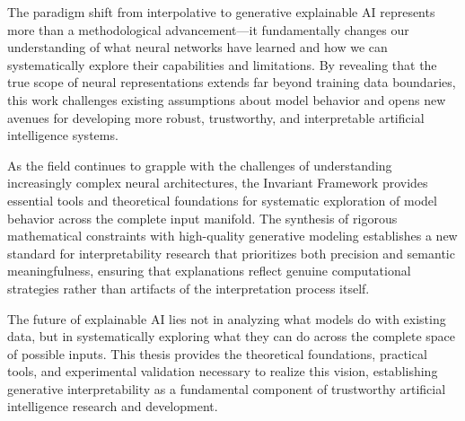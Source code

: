 The paradigm shift from interpolative to generative explainable AI represents more than a methodological advancement—it fundamentally changes our understanding of what neural networks have learned and how we can systematically explore their capabilities and limitations. By revealing that the true scope of neural representations extends far beyond training data boundaries, this work challenges existing assumptions about model behavior and opens new avenues for developing more robust, trustworthy, and interpretable artificial intelligence systems.

As the field continues to grapple with the challenges of understanding increasingly complex neural architectures, the Invariant Framework provides essential tools and theoretical foundations for systematic exploration of model behavior across the complete input manifold. The synthesis of rigorous mathematical constraints with high-quality generative modeling establishes a new standard for interpretability research that prioritizes both precision and semantic meaningfulness, ensuring that explanations reflect genuine computational strategies rather than artifacts of the interpretation process itself.

The future of explainable AI lies not in analyzing what models do with existing data, but in systematically exploring what they can do across the complete space of possible inputs. This thesis provides the theoretical foundations, practical tools, and experimental validation necessary to realize this vision, establishing generative interpretability as a fundamental component of trustworthy artificial intelligence research and development.
